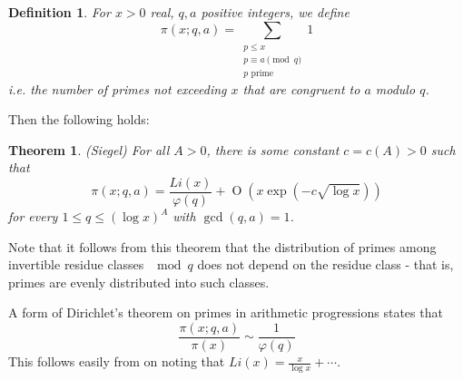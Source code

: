 \documentclass[12pt]{article}
\newtheorem{thm}{Theorem}
\newtheorem{defn}{Definition}
\DeclareMathOperator{\bigoh}{O}
\begin{document}
\begin{defn} For $x>0$ real, $q,a$ positive integers, we define
\[\pi(x;q,a)=\sum_{\substack{p\leq x\\p\equiv a\pmod q\\p \text{ prime}}} 1\]
i.e. the number of primes not exceeding $x$ that are congruent to $a$ modulo $q$.
\end{defn}

Then the following holds:
\begin{thm} (Siegel) For all $A>0$, there is some constant $c=c(A)>0$ such that
\[\pi(x;q,a) = \frac{Li(x)}{\varphi(q)} + \bigoh\left(x\exp(-c\sqrt{\log x})\right)\]
for every $1\leq q\leq (\log x)^A$ with $\gcd(q,a)=1$.
\end{thm}

Note that it follows from this theorem that the distribution of primes among invertible residue classes $\mod q$ does not depend on the residue class - that is, primes are evenly distributed into such classes.

A form of Dirichlet's theorem on primes in arithmetic progressions states that
\[\frac{\pi(x;q,a)}{\pi(x)} \sim \frac{1}{\varphi(q)}\]
This follows easily from  on noting that $Li(x) = \frac{x}{\log x}+\cdots$.
\end{document}
